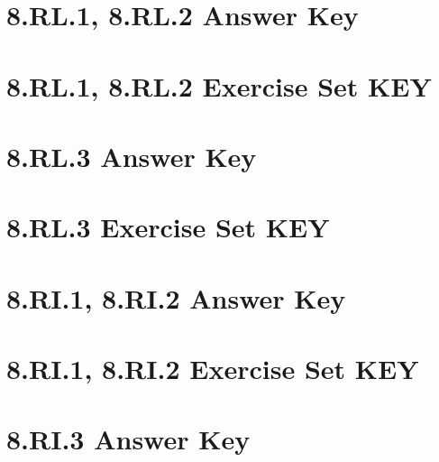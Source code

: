 \documentclass[a4paper,12pt]{article}
\title{}
\date{}
\begin{document}

\newpage

\hypertarget{toc}{}
\tableofcontents
\newpage

\pagestyle{main}

\newpage
\section{8.RL.1, 8.RL.2 Answer Key}


\newpage
\section{8.RL.1, 8.RL.2 Exercise Set KEY}

\newpage


\newpage
\section{8.RL.3 Answer Key}


\newpage
\section{8.RL.3 Exercise Set KEY}


\newpage
\section{8.RI.1, 8.RI.2 Answer Key}


\newpage
\section{8.RI.1, 8.RI.2 Exercise Set KEY}

\newpage


\newpage
\section{8.RI.3 Answer Key}

\end{document}
